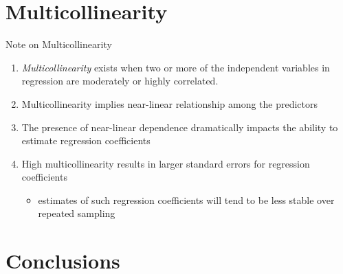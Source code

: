 \documentclass[ignorenonframetext,]{beamer}
\providecommand{\tightlist}{%
  \setlength{\itemsep}{0pt}\setlength{\parskip}{0pt}}
\begin{document}
\hypertarget{multicollinearity}{%
\section{Multicollinearity}\label{multicollinearity}}

\begin{frame}{Note on Multicollinearity}
\protect\hypertarget{note-on-multicollinearity}{}

\begin{enumerate}
\tightlist
\item
  \emph{Multicollinearity} exists when two or more of the independent
  variables in regression are moderately or highly correlated.
\item
  Multicollinearity implies near-linear relationship among the
  predictors
\item
  The presence of near-linear dependence dramatically impacts the
  ability to estimate regression coefficients
\item
  High multicollinearity results in larger standard errors for
  regression coefficients

  \begin{itemize}
  \tightlist
  \item
    estimates of such regression coefficients will tend to be less
    stable over repeated sampling
  \end{itemize}
\end{enumerate}

\end{frame}

\hypertarget{conclusions}{%
\section{Conclusions}\label{conclusions}}
\end{document}
